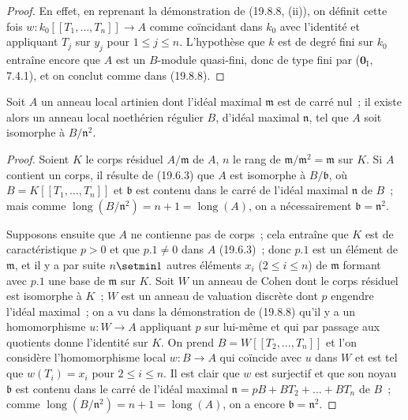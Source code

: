\begin{proof}
En effet, en reprenant la démonstration de (19.8.8, (ii)), on définit cette fois
$w:k_0[[T_1,\ldots,T_n]]\to A$ comme coïncidant dans $k_0$ avec l'identité et
appliquant $T_j$ sur $y_j$ pour $1\leq j\leq n$. L'hypothèse que $k$ est de
degré fini sur $k_0$ entraîne encore que $A$ est un $B$-module quasi-fini, donc
de type fini par ($\mathbf 0_{\mathrm I}$, 7.4.1), et on conclut comme dans
(19.8.8).
\end{proof}

\begin{corollary}[19.8.10]
\label{0.19.8.10-fr}
Soit $A$ un anneau local artinien dont l'idéal maximal $\mathfrak m$ est de
carré nul~; il existe alors un anneau local noethérien régulier $B$, d'idéal
maximal $\mathfrak n$, tel que $A$ soit isomorphe à $B/\mathfrak n^2$.
\end{corollary}

\begin{proof}
Soient $K$ le corps résiduel $A/\mathfrak m$ de $A$, $n$ le rang de
$\mathfrak m/\mathfrak m^2=\mathfrak m$ sur $K$. Si $A$ contient un corps, il
résulte de (19.6.3) que $A$ est isomorphe à $B/\mathfrak b$, où
$B=K[[T_1,\ldots,T_n]]$ et $\mathfrak b$ est contenu dans le carré de l'idéal
maximal $\mathfrak n$ de $B$~; mais comme
$\operatorname{long}(B/\mathfrak n^2)=n+1=\operatorname{long}(A)$, on a
nécessairement $\mathfrak b=\mathfrak n^2$.

Supposons ensuite que $A$ ne contienne pas de corps~; cela entraîne que $K$ est
de caractéristique $p>0$ et que $p.1\neq0$ dans $A$ (19.6.3)~; donc
$p.1$ est un élément de $\mathfrak m$, et il y a par suite $n\setmin 1$ autres
éléments $x_i$ ($2\leq i\leq n$) de $\mathfrak m$ formant avec $p.1$ une
base de $\mathfrak m$ sur $K$. Soit $W$ un anneau de Cohen dont le corps
résiduel est isomorphe à $K$~; $W$ est un anneau de valuation discrète dont $p$
engendre l'idéal maximal~; on a vu dans la démonstration de (19.8.8) qu'il y a
un homomorphisme $u:W\to A$ appliquant $p$ sur lui-même et qui par passage aux
quotients donne l'identité sur $K$. On prend $B=W[[T_2,\ldots,T_n]]$ et l'on
considère l'homomorphisme local $w:B\to A$ qui coïncide avec $u$ dans $W$ et
est tel que $w(T_i)=x_i$ pour $2\leq i\leq n$. Il est clair que $w$ est
surjectif et que son noyau $\mathfrak b$ est contenu dans le carré de l'idéal
maximal $\mathfrak n=pB+BT_2+\ldots+BT_n$ de $B$~; comme
$\operatorname{long}(B/\mathfrak n^2)=n+1=\operatorname{long}(A)$, on a encore
$\mathfrak b=\mathfrak n^2$.
\end{proof}

